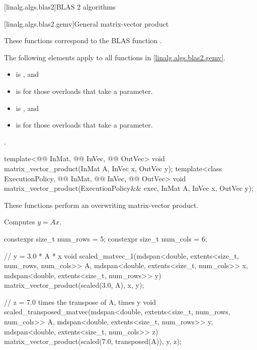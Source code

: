 [linalg.algs.blas2]{BLAS 2 algorithms}

[linalg.algs.blas2.gemv]{General matrix-vector product}

\pnum
\begin{note}
These functions correspond to the BLAS function .
\end{note}

\pnum
The following elements apply to all functions in \ref{linalg.algs.blas2.gemv}.

\pnum
\mandates
\begin{itemize}
\item
{}
is , and
\item
{}
is  for those overloads that take a  parameter.
\end{itemize}

\pnum
\expects
\begin{itemize}
\item
{} is , and
\item
{} is  for those overloads that take a  parameter.
\end{itemize}

\pnum
\complexity
{}.

%
\begin{itemdecl}
template<@@ InMat, @@ InVec, @@ OutVec>
  void matrix_vector_product(InMat A, InVec x, OutVec y);
template<class ExecutionPolicy, @@ InMat, @@ InVec, @@ OutVec>
  void matrix_vector_product(ExecutionPolicy&& exec, InMat A, InVec x, OutVec y);
\end{itemdecl}

\begin{itemdescr}
\pnum
These functions perform an overwriting matrix-vector product.

\pnum
\effects
Computes $y = A x$.
\end{itemdescr}

\begin{example}
\begin{codeblock}
constexpr size_t num_rows = 5;
constexpr size_t num_cols = 6;

// y = 3.0 * A * x
void scaled_matvec_1(mdspan<double, extents<size_t, num_rows, num_cols>> A,
  mdspan<double, extents<size_t, num_cols>> x, mdspan<double, extents<size_t, num_rows>> y) {
  matrix_vector_product(scaled(3.0, A), x, y);
}

// z = 7.0 times the transpose of A, times y
void scaled_transposed_matvec(mdspan<double, extents<size_t, num_rows, num_cols>> A,
  mdspan<double, extents<size_t, num_rows>> y, mdspan<double, extents<size_t, num_cols>> z) {
  matrix_vector_product(scaled(7.0, transposed(A)), y, z);
}
\end{codeblock}
\end{example}

